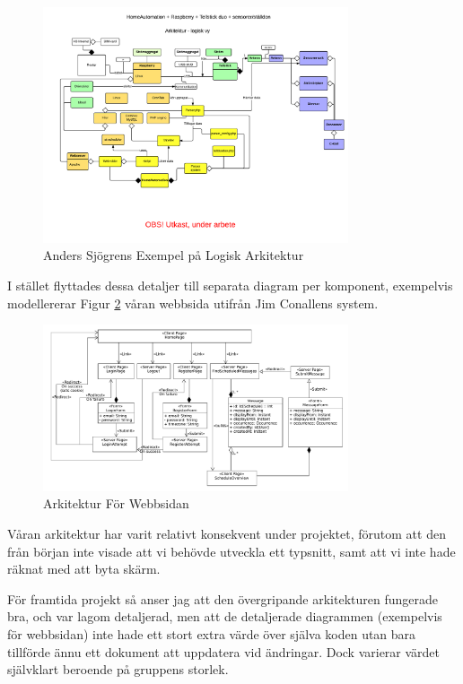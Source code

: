\documentclass[conference,a4paper]{IEEEtran}
\begin{document}
\begin{figure}[H]
\centering
\includegraphics[width=9cm]{homeautomation-logisk}
\caption{Anders Sjögrens Exempel på Logisk Arkitektur\cite{SjoegrenHALogisk}}
\label{architecture-logical-sjoegren}
\end{figure}

I stället flyttades dessa detaljer till separata diagram per komponent, exempelvis
modellererar Figur \ref{architecture-webside-class} våran webbsida utifrån
Jim Conallens system\cite{Conallen99}.

\begin{figure}[H]
\centering
\includegraphics[width=9cm]{../../Arkitektur/Webbsida_UML.pdf}
\caption{Arkitektur För Webbsidan}
\label{architecture-webside-class}
\end{figure}

Våran arkitektur har varit relativt konsekvent under projektet, förutom att den
från början inte visade att vi behövde utveckla ett typsnitt, samt att vi inte
hade räknat med att byta skärm.

För framtida projekt så anser jag att den övergripande arkitekturen fungerade bra,
och var lagom detaljerad, men att de detaljerade diagrammen (exempelvis för webbsidan)
inte hade ett stort extra värde över själva koden utan bara tillförde ännu ett dokument
att uppdatera vid ändringar. Dock varierar värdet självklart beroende på gruppens storlek.
\end{document}
